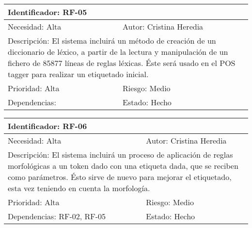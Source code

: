 \begin{table}[H]
\label{my-label}
\begin{tabular}{|l|l|l|l|l|l|l|}
\hline
\multicolumn{7}{|l|}{\textcolor{SchoolColor}{Identificador:} RF-05}                                 \\ \hline
\multicolumn{4}{|l|}{\textcolor{SchoolColor}{Necesidad:} Alta} & \multicolumn{3}{l|}{\textcolor{SchoolColor}{Autor:} Cristina Heredia}         \\ \hline
\multicolumn{7}{|L|}{\textcolor{SchoolColor}{Descripción:} El sistema incluirá un método de creación de un diccionario de léxico, a partir de la lectura y manipulación de un fichero de 85877 líneas de reglas léxicas. Éste será usado en el POS tagger para realizar un etiquetado inicial. }                                 \\ \hline
\multicolumn{4}{|l|}{\textcolor{SchoolColor}{Prioridad: }Alta} & \multicolumn{3}{l|}{\textcolor{SchoolColor}{Riesgo:} Medio}         \\ \hline
\multicolumn{5}{|l|}{\textcolor{SchoolColor}{Dependencias: } }         & \multicolumn{2}{l|}{\textcolor{SchoolColor}{Estado:} Hecho} \\ \hline
\end{tabular}
\end{table}

\begin{table}[H]
\label{my-label}
\begin{tabular}{|l|l|l|l|l|l|l|}
\hline
\multicolumn{7}{|l|}{\textcolor{SchoolColor}{Identificador:} RF-06}                                 \\ \hline
\multicolumn{4}{|l|}{\textcolor{SchoolColor}{Necesidad:} Alta} & \multicolumn{3}{l|}{\textcolor{SchoolColor}{Autor:} Cristina Heredia}         \\ \hline
\multicolumn{7}{|L|}{\textcolor{SchoolColor}{Descripción:} El sistema incluirá un proceso de aplicación  de reglas morfológicas a un token dado con una etiqueta dada, que se reciben como parámetros. Ésto sirve de nuevo para mejorar el etiquetado, esta vez teniendo en cuenta la morfología. }                                 \\ \hline
\multicolumn{4}{|l|}{\textcolor{SchoolColor}{Prioridad: }Alta} & \multicolumn{3}{l|}{\textcolor{SchoolColor}{Riesgo:} Medio}         \\ \hline
\multicolumn{5}{|l|}{\textcolor{SchoolColor}{Dependencias: }RF-02, RF-05 }         & \multicolumn{2}{l|}{\textcolor{SchoolColor}{Estado:} Hecho} \\ \hline
\end{tabular}
\end{table}


